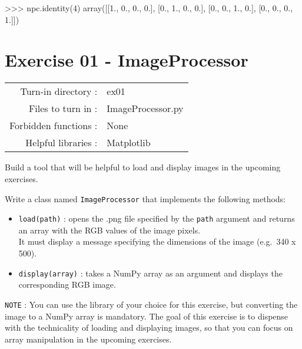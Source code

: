 \documentclass[]{article}
\newenvironment{Shaded}{\begin{snugshade}}{\end{snugshade}}
\newcommand{\DecValTok}[1]{\textcolor[rgb]{0.96,0.45,0.00}{#1}}
\newcommand{\FloatTok}[1]{\textcolor[rgb]{0.96,0.45,0.00}{#1}}
\newcommand{\NormalTok}[1]{\textcolor[rgb]{0.81,0.81,0.76}{#1}}
\newcommand{\OperatorTok}[1]{\textcolor[rgb]{0.81,0.81,0.76}{#1}}
\begin{document}
\begin{Shaded}
\begin{Highlighting}[]
\OperatorTok{>>>}\NormalTok{ npc.identity(}\DecValTok{4}\NormalTok{)}
\NormalTok{array([[}\FloatTok{1.}\NormalTok{, }\FloatTok{0.}\NormalTok{, }\FloatTok{0.}\NormalTok{, }\FloatTok{0.}\NormalTok{],}
\NormalTok{       [}\FloatTok{0.}\NormalTok{, }\FloatTok{1.}\NormalTok{, }\FloatTok{0.}\NormalTok{, }\FloatTok{0.}\NormalTok{],}
\NormalTok{       [}\FloatTok{0.}\NormalTok{, }\FloatTok{0.}\NormalTok{, }\FloatTok{1.}\NormalTok{, }\FloatTok{0.}\NormalTok{],}
\NormalTok{       [}\FloatTok{0.}\NormalTok{, }\FloatTok{0.}\NormalTok{, }\FloatTok{0.}\NormalTok{, }\FloatTok{1.}\NormalTok{]])}
\end{Highlighting}
\end{Shaded}

\clearpage

\hypertarget{exercise-01---imageprocessor-1}{%
\section{Exercise 01 -
ImageProcessor}\label{exercise-01---imageprocessor-1}}

\begin{longtable}[]{@{}rl@{}}
\toprule
\endhead
Turn-in directory : & ex01\tabularnewline
Files to turn in : & ImageProcessor.py\tabularnewline
Forbidden functions : & None\tabularnewline
Helpful libraries : & Matplotlib\tabularnewline
\bottomrule
\end{longtable}

Build a tool that will be helpful to load and display images in the
upcoming exercises.

Write a class named \texttt{ImageProcessor} that implements the
following methods:

\begin{itemize}
\item
  \texttt{load(path)} : opens the .png file specified by the
  \texttt{path} argument and returns an array with the RGB values of the
  image pixels.\\
  It must display a message specifying the dimensions of the image
  (e.g.~340 x 500).
\item
  \texttt{display(array)} : takes a NumPy array as an argument and
  displays the corresponding RGB image.
\end{itemize}

\texttt{NOTE} : You can use the library of your choice for this
exercise, but converting the image to a NumPy array is mandatory. The
goal of this exercise is to dispense with the technicality of loading
and displaying images, so that you can focus on array manipulation in
the upcoming exercises.
\end{document}

